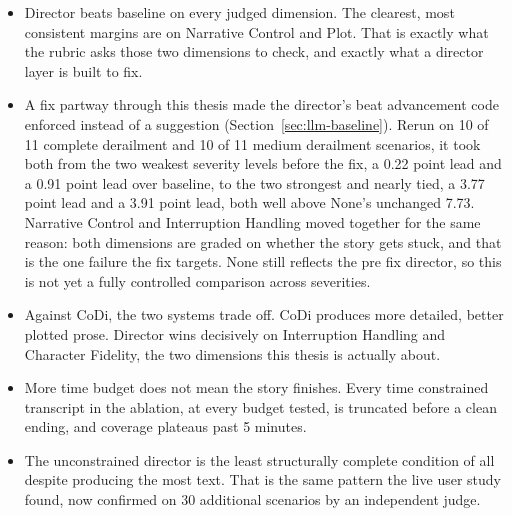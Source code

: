 \documentclass[10pt]{article}
\begin{document}
\begin{itemize}
\item Director beats baseline on every judged dimension. The clearest, most consistent margins are on Narrative Control and Plot. That is exactly what the rubric asks those two dimensions to check, and exactly what a director layer is built to fix.
\item A fix partway through this thesis made the director's beat advancement code enforced instead of a suggestion (Section~\ref{sec:llm-baseline}). Rerun on 10 of 11 complete derailment and 10 of 11 medium derailment scenarios, it took both from the two weakest severity levels before the fix, a 0.22 point lead and a 0.91 point lead over baseline, to the two strongest and nearly tied, a 3.77 point lead and a 3.91 point lead, both well above None's unchanged 7.73. Narrative Control and Interruption Handling moved together for the same reason: both dimensions are graded on whether the story gets stuck, and that is the one failure the fix targets. None still reflects the pre fix director, so this is not yet a fully controlled comparison across severities.
\item Against CoDi, the two systems trade off. CoDi produces more detailed, better plotted prose. Director wins decisively on Interruption Handling and Character Fidelity, the two dimensions this thesis is actually about.
\item More time budget does not mean the story finishes. Every time constrained transcript in the ablation, at every budget tested, is truncated before a clean ending, and coverage plateaus past 5 minutes.
\item The unconstrained director is the least structurally complete condition of all despite producing the most text. That is the same pattern the live user study found, now confirmed on 30 additional scenarios by an independent judge.
\end{itemize}
\end{document}
